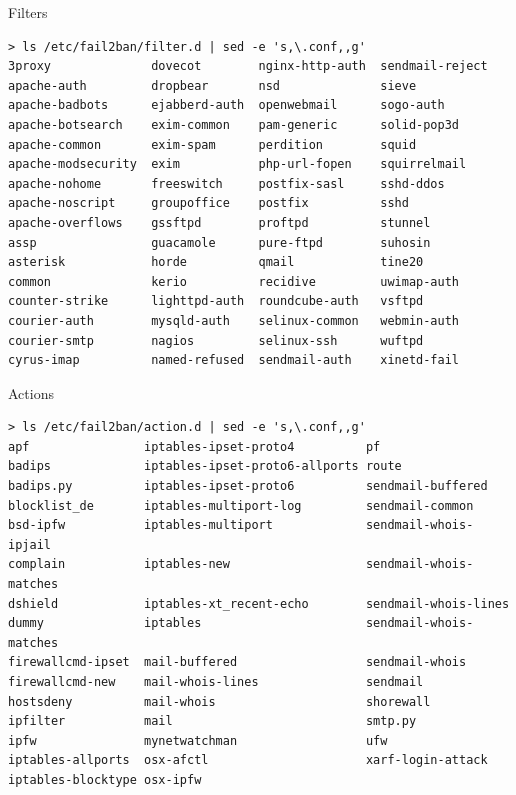 \documentclass[]{beamer}
\begin{document}
\begin{frame}[fragile]{Filters}

\begin{Verbatim}[fontsize=\scriptsize]
> ls /etc/fail2ban/filter.d | sed -e 's,\.conf,,g'
3proxy              dovecot        nginx-http-auth  sendmail-reject
apache-auth         dropbear       nsd              sieve
apache-badbots      ejabberd-auth  openwebmail      sogo-auth
apache-botsearch    exim-common    pam-generic      solid-pop3d
apache-common       exim-spam      perdition        squid
apache-modsecurity  exim           php-url-fopen    squirrelmail
apache-nohome       freeswitch     postfix-sasl     sshd-ddos
apache-noscript     groupoffice    postfix          sshd
apache-overflows    gssftpd        proftpd          stunnel
assp                guacamole      pure-ftpd        suhosin
asterisk            horde          qmail            tine20
common              kerio          recidive         uwimap-auth
counter-strike      lighttpd-auth  roundcube-auth   vsftpd
courier-auth        mysqld-auth    selinux-common   webmin-auth
courier-smtp        nagios         selinux-ssh      wuftpd
cyrus-imap          named-refused  sendmail-auth    xinetd-fail
\end{Verbatim}
\end{frame}


\begin{frame}[fragile]{Actions}

\begin{Verbatim}[fontsize=\scriptsize]
> ls /etc/fail2ban/action.d | sed -e 's,\.conf,,g'
apf                iptables-ipset-proto4          pf
badips             iptables-ipset-proto6-allports route
badips.py          iptables-ipset-proto6          sendmail-buffered
blocklist_de       iptables-multiport-log         sendmail-common
bsd-ipfw           iptables-multiport             sendmail-whois-ipjail
complain           iptables-new                   sendmail-whois-matches
dshield            iptables-xt_recent-echo        sendmail-whois-lines
dummy              iptables                       sendmail-whois-matches
firewallcmd-ipset  mail-buffered                  sendmail-whois
firewallcmd-new    mail-whois-lines               sendmail
hostsdeny          mail-whois                     shorewall
ipfilter           mail                           smtp.py
ipfw               mynetwatchman                  ufw
iptables-allports  osx-afctl                      xarf-login-attack
iptables-blocktype osx-ipfw
\end{Verbatim}
\end{frame}
\end{document}
